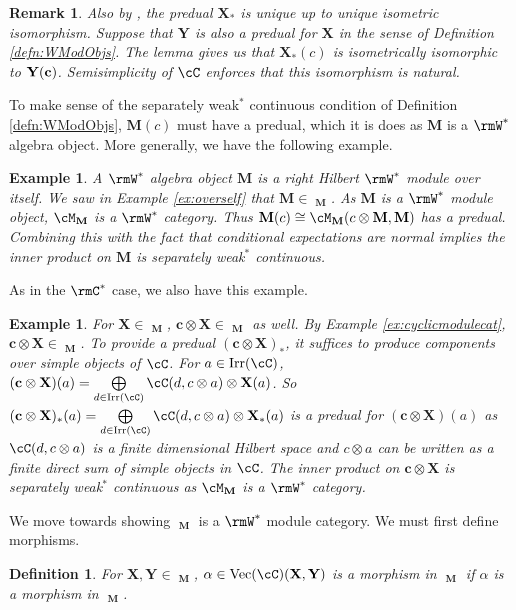 \documentclass[11pt,reqno]{amsart}
\DeclareMathOperator{\Irr}{Irr}
\DeclareMathOperator{\Vect}{Vec}
\DeclareMathOperator{\CMod}{C^*Mod}
\DeclareMathOperator{\WMod}{W^*Mod}
\newcommand{\bb}[1]{\mathbf{#1}}
\numberwithin{equation}{section}
\theoremstyle{plain}
\newtheorem{defn}[thm]{Definition}
\newtheorem{ex}[thm]{Example}
\newtheorem{rmk}[thm]{Remark}
\begin{document}
\begin{rmk}
Also by \cite[Lemma 8.5.4]{BLM04}, \emph{the} predual $\bb X_*$ is unique up to unique isometric isomorphism.
Suppose that $\bb Y$ is also a predual for $\bb X$ in the sense of Definition \ref{defn:WModObjs}.
The lemma gives us that $\bb X_*(c)$ is isometrically isomorphic to $\bf Y(c)$.
Semisimplicity of $\cC$ enforces that this isomorphism is natural.
\end{rmk}

To make sense of the separately weak$^*$ continuous condition of Definition \ref{defn:WModObjs}, $\bb M(c)$ must have a predual, which it is does as $\bb M$ is a $\rmW^*$ algebra object.
More generally, we have the following example.

\begin{ex}
A $\rmW^*$ algebra object $\bb M$ is a right Hilbert $\rmW^*$ module over itself.
We saw in Example \ref{ex:overself} that $\bb M \in \CMod_{\bb M}$.
As $\bb M$ is a $\rmW^*$ module object, $\cM_{\bb M}$ is a $\rmW^*$ category.
Thus $\bb M(c) \cong \cM_{\bb M}(c \otimes \bb M, \bb M)$ has a predual.
Combining this with the fact that conditional expectations are normal implies the inner product on $\bb M$ is separately weak$^*$ continuous.
\end{ex}

As in the $\rmC^*$ case, we also have this example.

\begin{ex} \label{ex:tensorbycompacts}
For $\bb X \in \WMod_{\bb M}$, $\bb c \otimes \bb X \in \WMod_{\bb M}$ as well.
By Example \ref{ex:cyclicmodulecat}, $\bb c \otimes \bb X \in \CMod_{\bb M}$.
To provide a predual $(\bb c \otimes \bb X)_*$, it suffices to produce components over simple objects of $\cC$.
For $a \in \Irr(\cC)$, $(\bb c \otimes \bb X)(a) = \bigoplus \limits_{d \in \Irr(\cC)} \cC(d, c \otimes a) \otimes \bb X(a)$.
So $(\bb c \otimes \bb X)_*(a) = \bigoplus \limits_{d \in \Irr(\cC)} \cC(d, c \otimes a) \otimes \bb X_*(a)$ is a predual for $(\bb c \otimes \bb X)(a)$ as $\cC(d, c \otimes a)$ is a finite dimensional Hilbert space and $c \otimes a$ can be written as a finite direct sum of simple objects in $\cC$.
The inner product on $\bb c \otimes \bb X$ is separately weak$^*$ continuous as $\cM_{\bb M}$ is a $\rmW^*$ category.
\end{ex}

We move towards showing $\WMod_{\bb M}$ is a $\rmW^*$ module category.
We must first define morphisms.

\begin{defn}
For $\bb X, \bb Y \in \WMod_{\bb M}$, $\alpha \in \Vect(\cC)(\bb X, \bb Y)$ is a morphism in $\WMod_{\bb M}$ if $\alpha$ is a morphism in $\CMod_{\bb M}$.
\end{defn}
\end{document}
